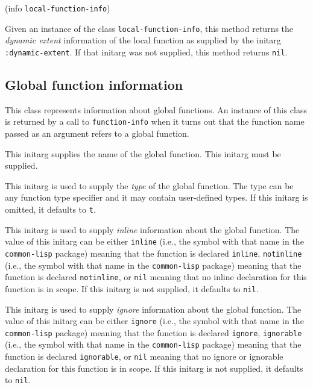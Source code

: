  {(info {\tt local-function-info})}

Given an instance of the class \texttt{local-function-info}, this
method returns the \emph{dynamic extent} information of the local
function as supplied by the initarg \texttt{:dynamic-extent}.  If that
initarg was not supplied, this method returns \texttt{nil}.

\subsection{Global function information}


This class represents information about global functions.  An instance
of this class is returned by a call to \texttt{function-info} when it
turns out that the function name passed as an argument refers to a
global function.


This initarg supplies the name of the global function.  This initarg
must be supplied.


This initarg is used to supply the \emph{type} of the global function.
The type can be any function type specifier and it may contain
user-defined types.  If this initarg is omitted, it defaults to
\texttt{t}.


This initarg is used to supply \emph{inline} information about the
global function.  The value of this initarg can be either
\texttt{inline} (i.e., the symbol with that name in the
\texttt{common-lisp} package) meaning that the function is declared
\texttt{inline}, \texttt{notinline} (i.e., the symbol with that name
in the \texttt{common-lisp} package) meaning that the function is
declared \texttt{notinline}, or \texttt{nil} meaning that no inline
declaration for this function is in scope.  If this initarg is not
supplied, it defaults to \texttt{nil}.


This initarg is used to supply \emph{ignore} information about the
global function.  The value of this initarg can be either
\texttt{ignore} (i.e., the symbol with that name in the
\texttt{common-lisp} package) meaning that the function is declared
\texttt{ignore}, \texttt{ignorable} (i.e., the symbol with that name
in the \texttt{common-lisp} package) meaning that the function is
declared \texttt{ignorable}, or \texttt{nil} meaning that no ignore or
ignorable declaration for this function is in scope.  If this initarg
is not supplied, it defaults to \texttt{nil}.


